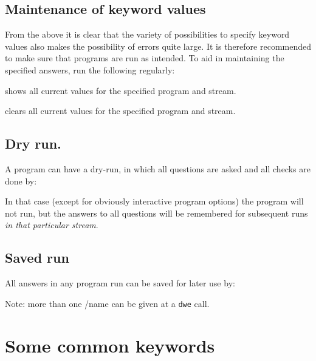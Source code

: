 \sline{:}


\subsection{Maintenance of keyword values}

From the above it is clear that the variety of possibilities to specify
keyword values also makes the possibility of errors quite large. It is therefore
recommended to make sure that programs are run as intended. To aid in
maintaining the specified answers, run the following regularly:


shows all current values for the specified program and stream.


clears all current values for the specified program and stream.



\subsection{Dry run.}

A program can have a dry-run, in which all questions are asked and all checks
are done by:


In that case (except for obviously interactive program options) the program will
not run, but the answers to all questions will be remembered 
for subsequent runs {\em in that particular stream}.

\subsection{Saved run}

All answers in any program run can be saved for later use by:


Note: more than one /name can be given at a {\tt dwe} call.

\section{Some common \NEWSTAR keywords}
\label{common.descr.newstar}


